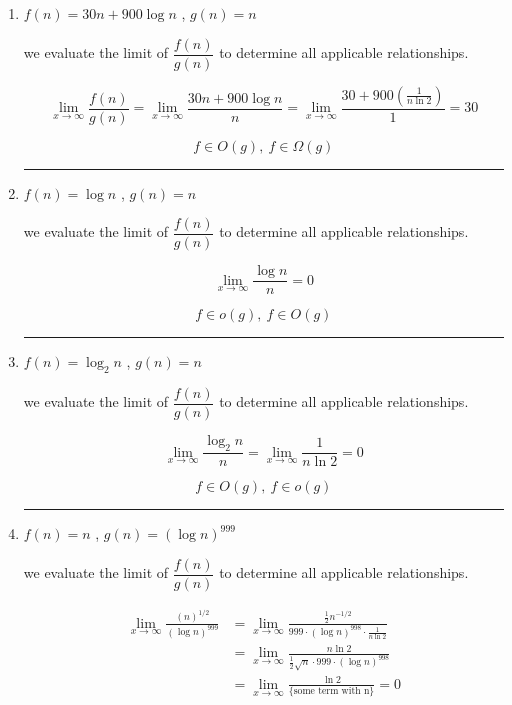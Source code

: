 \begin{enumerate}[label=\arabic*.]
    \item $f(n)=30n+900\log n$ , $g(n)=n$

    we evaluate the limit of $\dfrac{f(n)}{g(n)}$ to determine all applicable relationships.

    \[
        \lim_{x \to \infty} \frac{f(n)}{g(n)} = \lim_{x \to \infty} \frac{30n + 900 \log n}{n} = \lim_{x \to \infty} \frac{30 + 900 \left(\frac{1}{n \ln 2}\right)}{1} = 30
    \]

    \[
        \boxed{f \in O(g),\ f \in \Omega(g)}
    \]

    \medskip
    \begin{center}
        \rule{0.3\linewidth}{0.2pt}
    \end{center}
    \medskip

    \item $f(n)=\log n$ , $g(n)=n$

    we evaluate the limit of $\dfrac{f(n)}{g(n)}$ to determine all applicable relationships.

    \[
        \lim_{x \to \infty} \frac{\log n}{n} = 0
    \]

    \[
        \boxed{f \in o(g),\ f \in O(g)}
    \]

    \medskip
    \begin{center}
        \rule{0.3\linewidth}{0.2pt}
    \end{center}
    \medskip

    \item $f(n)=\log_2 n$ , $g(n)=n$

    we evaluate the limit of $\dfrac{f(n)}{g(n)}$ to determine all applicable relationships.

    \[
        \lim_{x \to \infty} \frac{\log_2 n}{n} = \lim_{x \to \infty} \frac{1}{n \ln 2} = 0
    \]

    \[
        \boxed{f \in O(g),\ f \in o(g)}
    \]

    \medskip
    \begin{center}
        \rule{0.3\linewidth}{0.2pt}
    \end{center}
    \medskip

    \item $f(n)=n$ , $g(n)=(\log n)^{999}$

    we evaluate the limit of $\dfrac{f(n)}{g(n)}$ to determine all applicable relationships.

    \[
    \begin{aligned}
        \lim_{x \to \infty} \frac{(n)^{1/2}}{(\log n)^{999}} &= \lim_{x \to \infty} \frac{\tfrac{1}{2} n^{-1/2}}{999 \cdot (\log n)^{998} \cdot \tfrac{1}{n \ln 2}} \\
        &= \lim_{x \to \infty} \frac{n \ln 2}{\tfrac{1}{2} \sqrt{n} \cdot 999 \cdot (\log n)^{998}}  \\
        &= \lim_{x \to \infty} \frac{\ln 2}{\text{\{some term  with n\}}} = 0
    \end{aligned}
    \]


\end{enumerate}
